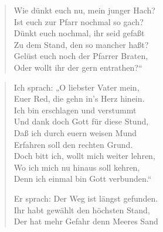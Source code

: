 \begin{quote}
Wie dünkt euch nu, mein junger Hach?\\
Ist euch zur Pfarr nochmal so gach?\\
Dünkt euch nochmal, ihr seid gefaßt\\
Zu dem Stand, den so mancher haßt?\\
Gelüst euch noch der Pfarrer Braten,\\
Oder wollt ihr der gern entrathen?“
\end{quote}

\begin{verse}
Ich sprach: „O liebster Vater mein,\\
Euer Red, die gehn in’s Herz hinein.\\
Ich bin erschlagen und verstummt\\
Und dank doch Gott für diese Stund,\\
Daß ich durch euern weisen Mund\\
Erfahren soll den rechten Grund.\\
Doch bitt ich, wollt mich weiter lehren,\\
Wo ich mich nu hinaus soll kehren,\\
Denn ich einmal bin Gott verbunden.“

Er sprach: Der Weg ist längst gefunden.\\
Ihr habt gewählt den höchsten Stand,\\
Der hat mehr Gefahr denn Meeres Sand
\end{verse}

